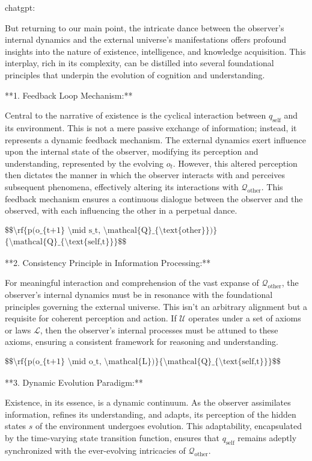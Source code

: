 chatgpt:

But returning to our main point, the intricate dance between the observer's internal dynamics and the external universe's manifestations offers profound insights into the nature of existence, intelligence, and knowledge acquisition. This interplay, rich in its complexity, can be distilled into several foundational principles that underpin the evolution of cognition and understanding.

**1. Feedback Loop Mechanism:**

Central to the narrative of existence is the cyclical interaction between \( q_{\text{self}} \) and its environment. This is not a mere passive exchange of information; instead, it represents a dynamic feedback mechanism. The external dynamics exert influence upon the internal state of the observer, modifying its perception and understanding, represented by the evolving \( o_t \). However, this altered perception then dictates the manner in which the observer interacts with and perceives subsequent phenomena, effectively altering its interactions with \( \mathcal{Q}_{\text{other}} \). This feedback mechanism ensures a continuous dialogue between the observer and the observed, with each influencing the other in a perpetual dance.

\[
\rf{p(o_{t+1} \mid s_t, \mathcal{Q}_{\text{other}})}{\mathcal{Q}_{\text{self,t}}}
\]

**2. Consistency Principle in Information Processing:** 

For meaningful interaction and comprehension of the vast expanse of \( \mathcal{Q}_{\text{other}} \), the observer's internal dynamics must be in resonance with the foundational principles governing the external universe. This isn't an arbitrary alignment but a requisite for coherent perception and action. If \( \mathcal{U} \) operates under a set of axioms or laws \( \mathcal{L} \), then the observer's internal processes must be attuned to these axioms, ensuring a consistent framework for reasoning and understanding.

\[
\rf{p(o_{t+1} \mid o_t, \mathcal{L})}{\mathcal{Q}_{\text{self,t}}}
\]

**3. Dynamic Evolution Paradigm:** 

Existence, in its essence, is a dynamic continuum. As the observer assimilates information, refines its understanding, and adapts, its perception of the hidden states \( s \) of the environment undergoes evolution. This adaptability, encapsulated by the time-varying state transition function, ensures that \( q_{\text{self}} \) remains adeptly synchronized with the ever-evolving intricacies of \( \mathcal{Q}_{\text{other}} \).

